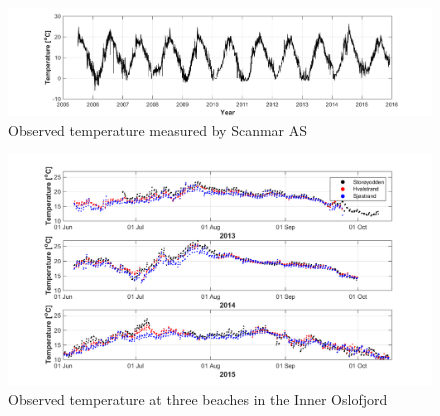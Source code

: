 \begin{figure}[ht]
\centerline{
\includegraphics*[trim=2cm 0cm 2cm 0cm,clip=true,width=\textwidth]{Figurer/temp_Scanmar}}
\caption{\small
Observed temperature measured by Scanmar AS}
\label{fig:Scan_temp}
\end{figure}

\begin{figure}[ht]
\centerline{
\includegraphics*[trim=2cm 0 2cm 0cm,clip=true,width=\textwidth]{Figurer/badetemp}
}
\caption{\small
Observed temperature at three beaches in the Inner Oslofjord}
\label{fig:temp_strand}
\end{figure}

